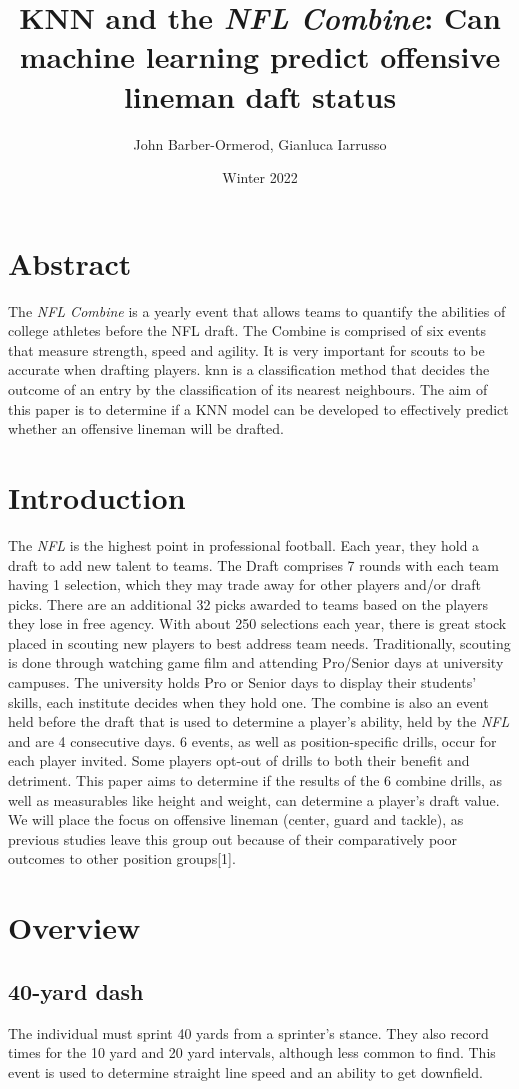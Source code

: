 \documentclass[confrence]{IEEEtran}
\title{KNN and the \textit{NFL Combine}: Can machine learning predict offensive lineman daft status}
\author{John Barber-Ormerod, Gianluca Iarrusso}
\date{Winter 2022}
\begin{document}
\maketitle
\section*{Abstract}
The \textit{NFL Combine} is a yearly event that allows teams to quantify the abilities of college athletes before the NFL draft.
The Combine is comprised of six events that measure strength, speed and agility.
It is very important for scouts to be accurate when drafting players.
knn is a classification method that decides the outcome of an entry by the classification of its nearest neighbours.
The aim of this paper is to determine if a KNN model can be developed to effectively predict whether an offensive lineman will be drafted.
\section*{Introduction}
The \textit{NFL} is the highest point in professional football. Each year, they hold a draft to add new talent to teams.
The Draft comprises 7 rounds with each team having 1 selection,
which they may trade away for other players and/or draft picks.
There are an additional 32 picks awarded to teams based on the players they lose in free agency.
With about 250 selections each year, there is great stock placed in scouting new players to best address team needs.
Traditionally, scouting is done through watching game film and attending Pro/Senior days at university campuses.
The university holds Pro or Senior days to display their students' skills, each institute decides when they hold one.
The combine is also an event held before the draft that is used to determine a player's ability, held by the \textit{NFL} and are 4 consecutive days.
6 events, as well as position-specific drills, occur for each player invited.
Some players opt-out of drills to both their benefit and detriment.
This paper aims to determine if the results of the 6 combine drills, as well as measurables like height and weight, can determine a player's draft value.
We will place the focus on offensive lineman (center, guard and tackle), as previous studies leave this group out because of their comparatively poor outcomes to other position groups[1].
\section*{Overview}
\subsection*{40-yard dash}
The individual must sprint 40 yards from a sprinter's stance. They also record times for the 10 yard and 20 yard intervals, although less common to find.
This event is used to determine straight line speed and an ability to get downfield.
\end{document}
